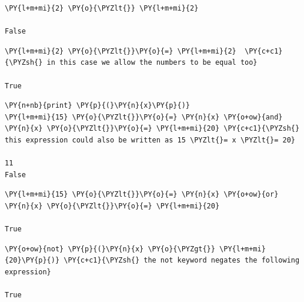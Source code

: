 \begin{tcolorbox}[breakable, size=fbox, boxrule=1pt, pad at break*=1mm, colback=cellbackground, colframe=cellborder]
\begin{Verbatim}[commandchars=\\\{\}]
\PY{l+m+mi}{2} \PY{o}{\PYZlt{}} \PY{l+m+mi}{2}

False
\end{Verbatim}
\end{tcolorbox}

\begin{tcolorbox}[breakable, size=fbox, boxrule=1pt, pad at break*=1mm, colback=cellbackground, colframe=cellborder]
\begin{Verbatim}[commandchars=\\\{\}]
\PY{l+m+mi}{2} \PY{o}{\PYZlt{}}\PY{o}{=} \PY{l+m+mi}{2}  \PY{c+c1}{\PYZsh{} in this case we allow the numbers to be equal too}

True
\end{Verbatim}
\end{tcolorbox}

\begin{tcolorbox}[breakable, size=fbox, boxrule=1pt, pad at break*=1mm, colback=cellbackground, colframe=cellborder]
\begin{Verbatim}[commandchars=\\\{\}]
\PY{n+nb}{print} \PY{p}{(}\PY{n}{x}\PY{p}{)}
\PY{l+m+mi}{15} \PY{o}{\PYZlt{}}\PY{o}{=} \PY{n}{x} \PY{o+ow}{and} \PY{n}{x} \PY{o}{\PYZlt{}}\PY{o}{=} \PY{l+m+mi}{20} \PY{c+c1}{\PYZsh{} this expression could also be written as 15 \PYZlt{}= x \PYZlt{}= 20}

11
False
\end{Verbatim}
\end{tcolorbox}

\begin{tcolorbox}[breakable, size=fbox, boxrule=1pt, pad at break*=1mm, colback=cellbackground, colframe=cellborder]            
\begin{Verbatim}[commandchars=\\\{\}]
\PY{l+m+mi}{15} \PY{o}{\PYZlt{}}\PY{o}{=} \PY{n}{x} \PY{o+ow}{or} \PY{n}{x} \PY{o}{\PYZlt{}}\PY{o}{=} \PY{l+m+mi}{20}

True
\end{Verbatim}
\end{tcolorbox}

\begin{tcolorbox}[breakable, size=fbox, boxrule=1pt, pad at break*=1mm, colback=cellbackground, colframe=cellborder]            
\begin{Verbatim}[commandchars=\\\{\}]
\PY{o+ow}{not} \PY{p}{(}\PY{n}{x} \PY{o}{\PYZgt{}} \PY{l+m+mi}{20}\PY{p}{)} \PY{c+c1}{\PYZsh{} the not keyword negates the following expression}

True
\end{Verbatim}
\end{tcolorbox}

